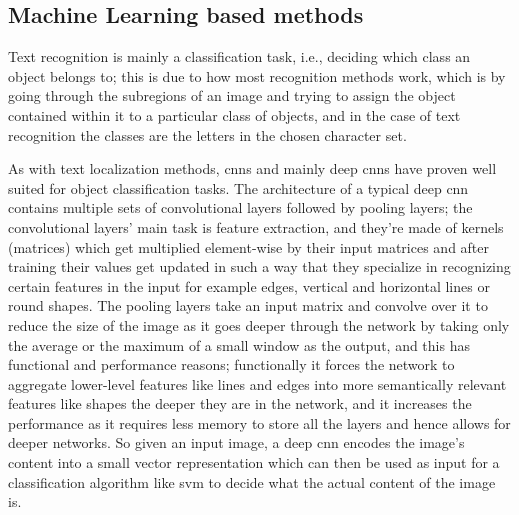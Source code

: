 \subsection{Machine Learning based methods}

Text recognition is mainly a classification task, i.e., deciding which class an object belongs to; this is due to how most recognition methods work, which is by going through the subregions of an image and trying to assign the object contained within it to a particular class of objects, and in the case of text recognition the classes are the letters in the chosen character set.

As with text localization methods, \gls{cnn}s and mainly deep \gls{cnn}s have proven well suited for object classification tasks. The architecture of a typical deep \gls{cnn} contains multiple sets of convolutional layers followed by pooling layers; the convolutional layers' main task is feature extraction, and they're made of kernels (matrices) which get multiplied element-wise by their input matrices and after training their values get updated in such a way that they specialize in recognizing certain features in the input for example edges, vertical and horizontal lines or round shapes. The pooling layers take an input matrix and convolve over it to reduce the size of the image as it goes deeper through the network by taking only the average or the maximum of a small window as the output, and this has functional and performance reasons; functionally it forces the network to aggregate lower-level features like lines and edges into more semantically relevant features like shapes the deeper they are in the network, and it increases the performance as it requires less memory to store all the layers and hence allows for deeper networks. So given an input image, a deep \gls{cnn} encodes the image's content into a small vector representation which can then be used as input for a classification algorithm like \gls{svm} to decide what the actual content of the image is.

